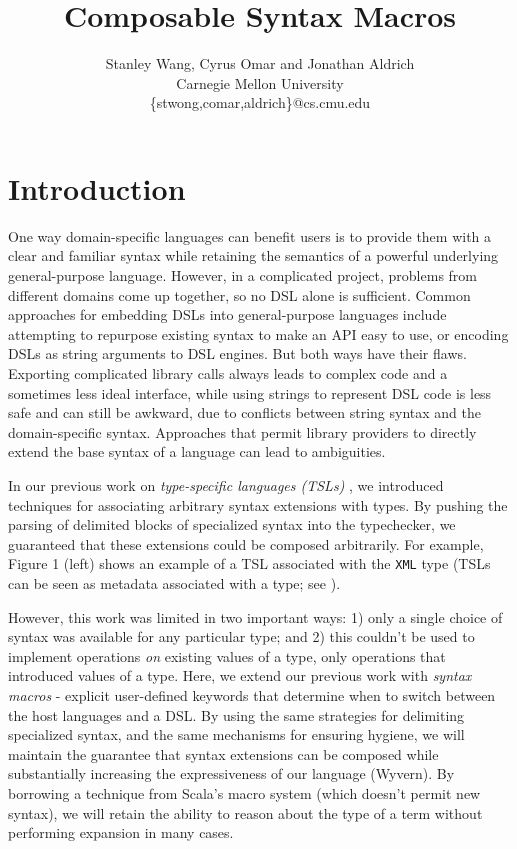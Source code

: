 \documentclass[letterpaper, notitlepage]{article}
\begin{document}
\title{Composable Syntax Macros}
\author{Stanley Wang, Cyrus Omar and Jonathan Aldrich\\
Carnegie Mellon University\\
\{stwong,comar,aldrich\}@cs.cmu.edu}
\date{}
\maketitle

\section{Introduction}
One way domain-specific languages can benefit users is to provide them with a clear and familiar syntax while retaining the semantics of a powerful underlying general-purpose language. However, in a complicated project, problems from different domains come up together, so no DSL alone is sufficient. Common approaches for embedding DSLs into general-purpose languages include attempting to repurpose existing syntax to make an API easy to use, or encoding DSLs as string arguments to DSL engines. But both ways have their flaws. Exporting complicated library calls always leads to complex code and a sometimes less ideal interface, while using strings to represent DSL code is less safe and can still be awkward, due to conflicts between string syntax and the domain-specific syntax. Approaches that permit library providers to directly extend the base syntax of a language can lead to ambiguities.

In our previous work on \emph{type-specific languages (TSLs)} \cite{TSLs}, we introduced techniques for associating arbitrary syntax extensions with types. By pushing the parsing of delimited blocks of specialized syntax into the typechecker, we guaranteed that these extensions could be composed arbitrarily. For example, Figure 1 (left) shows an example of a TSL associated with the \verb|XML| type (TSLs can be seen as metadata associated with a type; see \cite{TSLs}).

However, this work was limited in two important ways: 1) only a single choice of syntax was available for any particular type; and 2) this couldn't be used to implement operations \emph{on} existing values of a type, only operations that introduced values of a type. Here, we extend our previous work with \emph{syntax macros} - explicit user-defined keywords that determine when to switch between the host languages and a DSL. By using the same strategies for delimiting specialized syntax, and the same mechanisms for ensuring hygiene, we will maintain the guarantee that syntax extensions can be composed while substantially increasing the expressiveness of our language (Wyvern). By borrowing a technique from Scala's macro system (which doesn't permit new syntax), we will retain the ability to reason about the type of a term without performing expansion in many cases.
\end{document}
